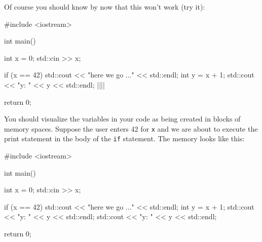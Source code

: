 Of course you should know by now that this won't work (try it):

\begin{consolethree}[escapeinside=||]
#include <iostream>

int main()
{    
     int x = 0;
     std::cin >> x;
     
     if (x == 42)
     {    
          std::cout << "here we go ..." << std::endl;
          int y = x + 1;
          std::cout << "y: " << y << std::endl;
     }
     ||||

     return 0;
} 
\end{consolethree}
\newpage %
You should visualize the variables in your code as being created in blocks of memory spaces. Suppose the user enters 42 for \texttt{x} and we are about to execute the print statement in the body of the \texttt{if} statement. The memory looks like this:
\sidenote
{
}

\begin{consolethree}[escapeinside=||]
#include <iostream>

int main()
{    
     int x = 0;
     std::cin >> x;
     
     if (x == 42)
     {   
         std::cout << "here we go ..." << std::endl;
         int y = x + 1;
         std::cout << "y: " << y << std::endl;
     }
     std::cout << "y: " << y << std::endl;

     return 0;
}
\end{consolethree}

